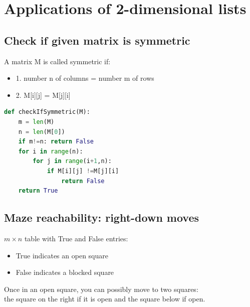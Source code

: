 \documentclass[12pt,oneside]{book}
\begin{document}
\section{Applications of 2-dimensional lists}
\subsection{Check if given matrix is symmetric}
A matrix M is called symmetric if:
\begin{itemize}
	\item 1. number n of columns = number m of rows
	\item 2. M[i][j] = M[j][i]
\end{itemize}
{\small\begin{lstlisting}[language=python]
def checkIfSymmetric(M):
    m = len(M)
    n = len(M[0])
    if m!=n: return False 
    for i in range(n):
        for j in range(i+1,n):
            if M[i][j] !=M[j][i]
                return False
    return True
\end{lstlisting}}
\subsection{Maze reachability: right-down moves}
$m\times n$ table with True and False entries:
\begin{itemize}
	\item True indicates an open square
	\item False indicates a blocked square
\end{itemize}
Once in an open square, you can possibly move to two squares: \\
the square on the right if it is open and the square below if open.
\end{document}
